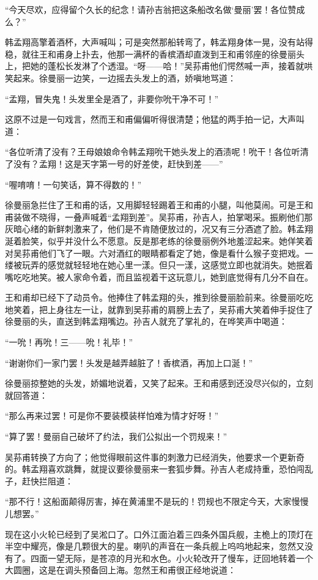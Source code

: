 \par “今天尽欢，应得留个久长的纪念！请孙吉翁把这条船改名做‘曼丽’罢！各位赞成么？”
\par 韩孟翔高擎着酒杯，大声喊叫；可是突然那船转弯了，韩孟翔身体一晃，没有站得稳，就往王和甫身上扑去，他那一满杯的香槟酒却直泼到王和甫邻座的徐曼丽头上，把她的蓬松长发淋了个透湿。“呀——哈！”吴荪甫他们愕然喊一声，接着就哄笑起来。徐曼丽一边笑，一边摇去头发上的酒，娇嗔地骂道：
\par “孟翔，冒失鬼！头发里全是酒了，非要你吮干净不可！”
\par 这原不过是一句戏言，然而王和甫偏偏听得很清楚；他猛的两手拍一记，大声叫道：
\par “各位听清了没有？王母娘娘命令韩孟翔吮干她头发上的酒渍呢！吮干！各位听清了没有？孟翔！这是天字第一号的好差使，赶快到差——”
\par “喔唷唷！一句笑话，算不得数的！”
\par 徐曼丽急拦住了王和甫的话，又用脚轻轻踢着王和甫的小腿，叫他莫闹。可是王和甫装做不晓得，一叠声喊着“孟翔到差”。吴荪甫，孙吉人，拍掌喝采。振刷他们那灰暗心绪的新鲜刺激来了，他们是不肯随便放过的，况又有三分酒遮了脸。韩孟翔涎着脸笑，似乎并没什么不愿意。反是那老练的徐曼丽例外地羞涩起来。她佯笑着对吴荪甫他们飞了一眼。六对酒红的眼睛都看定了她，像是看什么猴子变把戏。一缕被玩弄的感觉就轻轻地在她心里一漾。但只一漾，这感觉立即也就消失。她抿着嘴吃吃地笑。被人家命令着，而且监视着干这玩意儿，她到底觉得有几分不自在。
\par 王和甫却已经下了动员令。他捧住了韩孟翔的头，推到徐曼丽脸前来。徐曼丽吃吃地笑着，把上身往左一让，就靠到吴荪甫的肩膀上去了，吴荪甫大笑着伸手捉住了徐曼丽的头，直送到韩孟翔嘴边。孙吉人就充了掌礼的，在哗笑声中喝道：
\par “一吮！再吮！三——吮！礼毕！”
\par “谢谢你们一家门罢！头发是越弄越脏了！香槟酒，再加上口涎！”
\par 徐曼丽掠整她的头发，娇媚地说着，又笑了起来。王和甫感到还没尽兴似的，立刻就回答道：
\par “那么再来过罢！可是你不要装模装样怕难为情才好呀！”
\par “算了罢！曼丽自己破坏了约法，我们公拟出一个罚规来！”
\par 吴荪甫转换了方向了；他觉得眼前这件事的刺激力已经消失，他要求一个更新奇的。韩孟翔喜欢跳舞，就提议要徐曼丽来一套狐步舞。孙吉人老成持重，恐怕闯乱子，赶快拦阻道：
\par “那不行！这船面颠得厉害，掉在黄浦里不是玩的！罚规也不限定今天，大家慢慢儿想罢。”
\par 现在这小火轮已经到了吴淞口了。口外江面泊着三四条外国兵舰，主桅上的顶灯在半空中耀亮，像是几颗很大的星。喇叭的声音在一条兵舰上呜呜地起来，忽然又没有了。四面一望无际，是苍凉的月光和水色。小火轮改开了慢车，迂回地转着一个大圆圈，这是在调头预备回上海。忽然王和甫很正经地说道：
